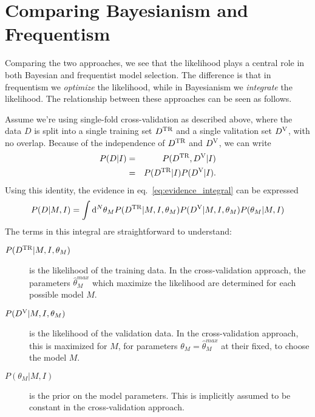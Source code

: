 \documentclass[12pt]{article}
\newcommand{\dd}{\mathrm{d}}
\newcommand{\Dtr}{\ensuremath{D^{\rm TR}}}
\newcommand{\Dva}{\ensuremath{D^{\rm V}}}
\newcommand{\eqn}[1]{eq.~\ref{eq:#1}}
\begin{document}
\section{Comparing Bayesianism and Frequentism}
Comparing the two approaches, we see that the likelihood plays a central
role in both Bayesian and frequentist model selection.  The difference
is that in frequentism we {\it optimize} the likelihood, while in
Bayesianism we {\it integrate} the likelihood.  The relationship between
these approaches can be seen as follows.

Assume we're using single-fold cross-validation as described above, where
the data $D$ is split into a single training set \Dtr{} and a single
valitation set \Dva{}, with no overlap.
Because of the independence of \Dtr{} and \Dva{}, we can write
\begin{eqnarray}
  P(D|I) &=& P(\Dtr,\Dva|I)\\
             &=& P(\Dtr|I)P(\Dva|I).
\end{eqnarray}
Using this identity, the evidence in \eqn{evidence_integral} can be expressed
\begin{equation}
  P(D|M,I) = \int \dd^N\theta_M P(\Dtr|M, I, \theta_M)
  P(\Dva|M,I,\theta_M)P(\theta_M|M,I)
\end{equation}
The terms in this integral are straightforward to understand:
\begin{description}
  \item[$P(\Dtr|M, I, \theta_M)$] is the likelihood of the training data.
    In the cross-validation approach, the parameters $\hat{\theta}^{max}_M$ which
    maximize the likelihood are determined for each possible model $M$.
  \item[$P(\Dva|M, I, \theta_M)$] is the likelihood of the validation
    data.  In the cross-validation approach, this is maximized for $M$,
    for parameters $\theta_M = \hat{\theta}^{max}_M$ at their fixed, to choose
    the model $M$.
  \item[$P(\theta_M|M,I)$] is the prior on the model parameters.  This is
    implicitly assumed to be constant in the cross-validation approach.
\end{description}
\end{document}
